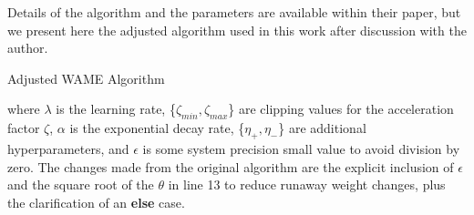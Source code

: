 \documentclass[12pt]{article}
\numberwithin{equation}{section}
\numberwithin{figure}{section}
\numberwithin{table}{section}
\begin{document}
Details of the algorithm and the parameters are available within their paper, but we present here the adjusted algorithm used in this work after discussion with the author.

\begin{algorithm}
  \caption{Adjusted WAME Algorithm}\label{wame}
  \end{algorithm}
where $\lambda$ is the learning rate, \{$\zeta_{min}, \zeta_{max}$\} are clipping values for the acceleration factor $\zeta$, $\alpha$ is the exponential decay rate, \{$\eta_{+}, \eta_{-}$\} are additional hyperparameters, and $\epsilon$ is some system precision small value to avoid division by zero. The changes made from the original algorithm are the explicit inclusion of $\epsilon$ and the square root of the $\theta$ in line 13 to reduce runaway weight changes, plus the clarification of an \textbf{else} case. 
\end{document}
